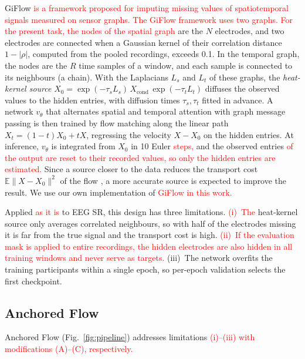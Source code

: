\documentclass{article}
\begin{document}
GiFlow \cite{zhang2026giflow} \textcolor{red}{is a framework proposed for imputing missing
values of spatiotemporal signals measured on sensor graphs. The GiFlow
framework uses two graphs. For the present task, the nodes of the spatial
graph} are the $N$ electrodes, and two electrodes are connected when a
Gaussian kernel of their correlation distance $1-|\rho|$, computed from the
pooled recordings, exceeds 0.1. In the temporal graph, the nodes are the $R$
time samples of a window, and each sample is connected to its neighbours
(a chain). With the Laplacians $L_s$ and $L_t$ of these graphs, the
\emph{heat-kernel source}
$X_0=\exp(-\tau_sL_s)\,X_{\mathrm{cond}}\,\exp(-\tau_tL_t)$ diffuses the
observed values to the hidden entries, with diffusion times
$\tau_s,\tau_t$ fitted in advance. A network $v_\theta$ that alternates
spatial and temporal attention with graph message passing is then trained
by flow matching \cite{lipman2023flow} along the linear path
$X_t=(1-t)X_0+tX$, regressing the velocity $X-X_0$ on the hidden entries.
At inference, $v_\theta$ is integrated from $X_0$ in 10 Euler \textcolor{red}{steps,} and
the observed entries \textcolor{red}{of the output are reset to their recorded values, so
only the hidden entries are estimated.} Since a source closer to the data
reduces the transport cost $\mathbb{E}\|X-X_0\|^2$ of the flow
\cite{zhang2026giflow}, a more accurate source is expected to improve the
result. We use our own implementation of \textcolor{red}{GiFlow in this work.}

Applied \textcolor{red}{as it is} to EEG SR, this design has three limitations. \textcolor{red}{(i)~The}
heat-kernel source only averages correlated neighbours, so with half of
the electrodes missing it is far from the true signal and the transport
cost is high. \textcolor{red}{(ii)~If the evaluation mask is applied to entire recordings,
the hidden electrodes are also hidden in all training windows and never
serve as targets.} (iii)~The network overfits the training participants
within a single epoch, so per-epoch validation selects the first
checkpoint.

\subsection{Anchored Flow}

Anchored Flow (Fig.~\ref{fig:pipeline}) addresses limitations \textcolor{red}{(i)--(iii)
with modifications (A)--(C), respectively.}
\end{document}
